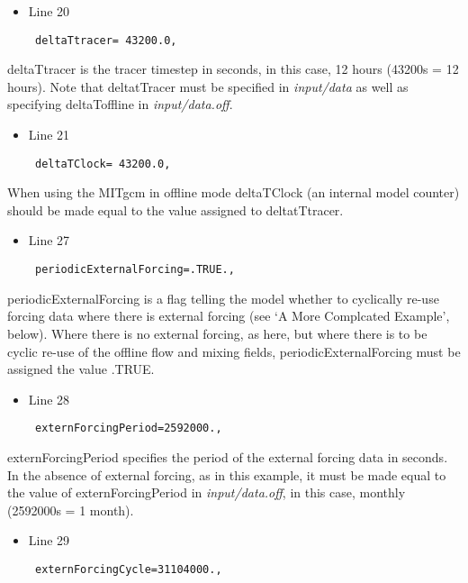 \begin{itemize}
\item Line 20
\begin {verbatim}
 deltaTtracer= 43200.0,
\end{verbatim}
\end{itemize}

\noindent deltaTtracer is the tracer timestep in seconds, in this
case, 12 hours (43200s = 12 hours). Note that deltatTracer must be
specified in {\it input/data} as well as specifying deltaToffline in
{\it input/data.off}.

\begin{itemize}
\item Line 21
\begin {verbatim}
 deltaTClock= 43200.0,
\end{verbatim}
\end{itemize}

\noindent When using the MITgcm in offline mode deltaTClock (an
internal model counter) should be made equal to the value assigned to
deltatTtracer.

\begin{itemize}
\item Line 27
\begin {verbatim}
 periodicExternalForcing=.TRUE.,
\end{verbatim}
\end{itemize}

\noindent periodicExternalForcing is a flag telling the model whether
to cyclically re-use forcing data where there is external forcing (see
`A More Complcated Example', below). Where there is no external
forcing, as here, but where there is to be cyclic re-use of the
offline flow and mixing fields, periodicExternalForcing must be
assigned the value .TRUE.

\begin{itemize}
\item Line 28
\begin {verbatim}
 externForcingPeriod=2592000.,
\end{verbatim}
\end{itemize}

\noindent externForcingPeriod specifies the period of the external
forcing data in seconds. In the absence of external forcing, as in
this example, it must be made equal to the value of
externForcingPeriod in {\it input/data.off}, in this case, monthly
(2592000s = 1 month).

\begin{itemize}
\item Line 29
\begin {verbatim}
 externForcingCycle=31104000.,
\end{verbatim}
\end{itemize}


